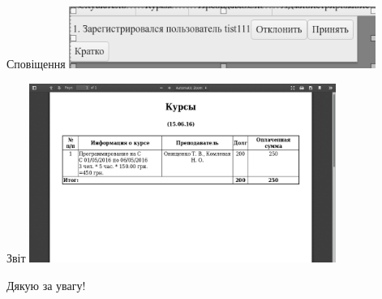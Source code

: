 \documentclass{beamer}
\begin{document}
\begin{frame}{\fn Сповіщення}
\includegraphics[width=10cm]{scrns/notifications.png}
\end{frame}
\begin{frame}{\fn Звіт}
\includegraphics[width=10cm]{scrns/report.png}
\end{frame}
\begin{frame}{}
\begin{center}
{\fontsize{48pt}{48pt}\selectfont Дякую за увагу!}
\end{center}
\end{frame}
\end{document}
